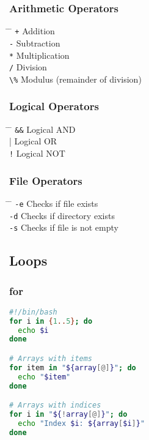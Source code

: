 \documentclass[a4paper,10pt]{article}
\begin{document}
\subsubsection*{Arithmetic Operators}
\begin{tabbing}
	\= \hspace{30mm} \= \hspace{50mm} \kill
	\> \verb|+| \> Addition \\
	\> \verb|-| \> Subtraction \\
	\> \verb|*| \> Multiplication \\
	\> \verb|/| \> Division \\
	\> \verb|\%| \> Modulus (remainder of division) \\
\end{tabbing}

\subsubsection*{Logical Operators}
\begin{tabbing}
	\= \hspace{30mm} \= \hspace{50mm} \kill
	\> \verb|&&| \> Logical AND \\
	\> \verb||| \> Logical OR \\
	\> \verb|!| \> Logical NOT \\
\end{tabbing}

\subsubsection*{File Operators}
\begin{tabbing}
	\= \hspace{30mm} \= \hspace{50mm} \kill
	\> \verb|-e| \> Checks if file exists \\
	\> \verb|-d| \> Checks if directory exists \\
	\> \verb|-s| \> Checks if file is not empty \\
\end{tabbing}

\subsection{Loops}
\subsubsection*{for}
\begin{lstlisting}[language=bash]
#!/bin/bash
for i in {1..5}; do
  echo $i
done

# Arrays with items
for item in "${array[@]}"; do 
  echo "$item"
done 

# Arrays with indices
for i in "${!array[@]}"; do 
  echo "Index $i: ${array[$i]}"
done
\end{lstlisting}
\end{document}
